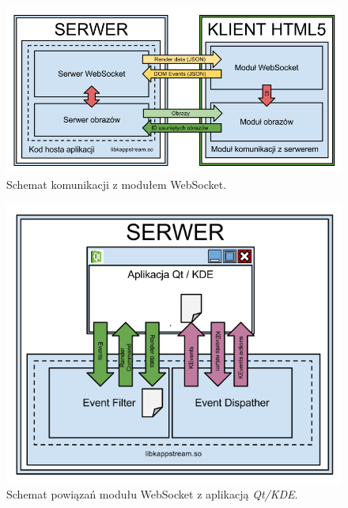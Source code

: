 \begin{figure}[H]
\centering
\includegraphics[width=1.0\linewidth]{img/arch-socket}
\caption{Schemat komunikacji z modułem WebSocket.}
\label{fig:arch-socket}
\end{figure}

\begin{figure}[H]
\centering
\includegraphics[width=1.0\linewidth]{img/arch-hook}
\caption{Schemat powiązań modułu WebSocket z aplikacją \emph{Qt/KDE}.}
\label{fig:arch-hook}
\end{figure}
